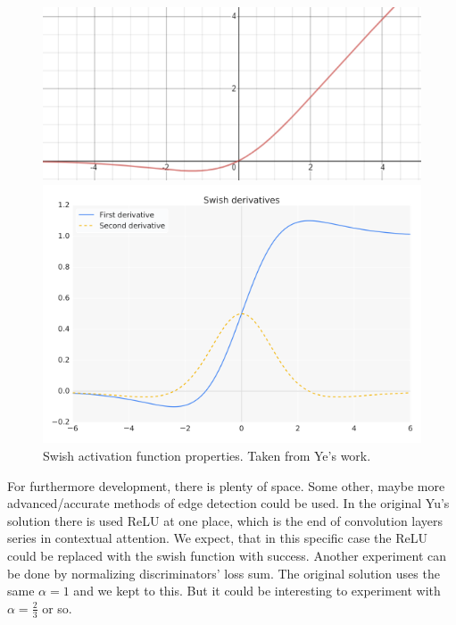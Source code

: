 \documentclass[a4paper, 11pt]{article}
\begin{document}
\begin{figure}
    \centering
    \begin{minipage}{.48\textwidth}
      \centering
      \includegraphics[width=.95\linewidth]{documentation/img/swish.png}
    \end{minipage}%
    \begin{minipage}{.49\textwidth}
      \centering
      \includegraphics[width=.95\linewidth]{documentation/img/swish_derivates.png}
    \end{minipage}
    \caption{Swish activation function properties. Taken from Ye's work.\cite{Ye_swish}}
    \label{img:swish}
\end{figure}

For furthermore development, there is plenty of space. Some other, maybe more advanced/accurate methods of edge detection could be used. In the original Yu's solution there is used ReLU at one place, which is the end of convolution layers series in contextual attention. We expect, that in this specific case the ReLU could be replaced with the swish function with success.
Another experiment can be done by normalizing discriminators' loss sum. The original solution uses the same $\alpha=1$ and we kept to this. But it could be interesting to experiment with $\alpha=\frac{2}{3}$ or so.
\end{document}
